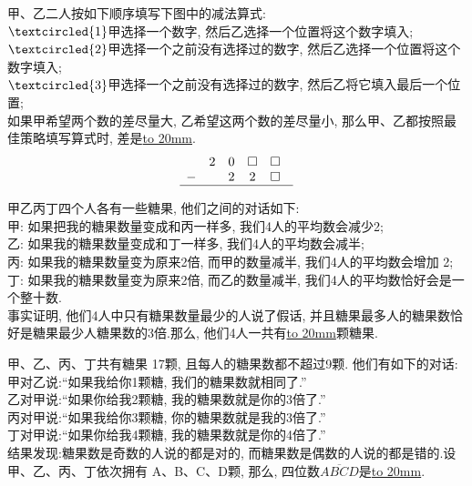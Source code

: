 \item {
    甲、乙二人按如下顺序填写下图中的减法算式:\\
    $\textcircled{1}$甲选择一个数字, 然后乙选择一个位置将这个数字填入;\\
    $\textcircled{2}$甲选择一个之前没有选择过的数字, 然后乙选择一个位置将这个数字填入;\\
    $\textcircled{3}$甲选择一个之前没有选择过的数字, 然后乙将它填入最后一个位置;\\
    如果甲希望两个数的差尽量大, 乙希望这两个数的差尽量小, 那么甲、乙都按照最佳策略填写算式时, 差是\underline{\hbox to 20mm{}}.
    \[
    \begin{array}{l@{\hspace{1em}} c@{\hspace{1em}} c@{\hspace{1em}} c@{\hspace{1em}} c@{\hspace{1em}}}
    & 2 & 0 & \square & \square \\
    - & & 2 & 2 & \square \\ 
    \hline
    \end{array}
    \]
    \vspace{1cm}
}

\item {
    甲乙丙丁四个人各有一些糖果, 他们之间的对话如下:\\
    甲: 如果把我的糖果数量变成和丙一样多, 我们4人的平均数会减少2;\\
    乙: 如果我的糖果数量变成和丁一样多, 我们4人的平均数会减半; \\
    丙: 如果我的糖果数量变为原来2倍, 而甲的数量减半, 我们4人的平均数会增加 2; \\
    丁: 如果我的糖果数量变为原来2倍, 而乙的数量减半, 我们4人的平均数恰好会是一个整十数. \\
    事实证明, 他们4人中只有糖果数量最少的人说了假话, 并且糖果最多人的糖果数恰好是糖果最少人糖果数的3倍.那么, 他们4人一共有\underline{\hbox to 20mm{}}颗糖果.
    \vspace{1cm}
}

\item {
    甲、乙、丙、丁共有糖果 17颗, 且每人的糖果数都不超过9颗. 他们有如下的对话:\\
    甲对乙说:``如果我给你1颗糖, 我们的糖果数就相同了.''\\
    乙对甲说:``如果你给我2颗糖, 我的糖果数就是你的3倍了.''\\
    丙对甲说:``如果我给你3颗糖, 你的糖果数就是我的3倍了.''\\
    丁对甲说:``如果你给我4颗糖, 我的糖果数就是你的4倍了.''\\
    结果发现:糖果数是奇数的人说的都是对的, 而糖果数是偶数的人说的都是错的.设甲、乙、丙、丁依次拥有 A、B、C、D颗, 那么, 四位数$\overline{ABCD}$是\underline{\hbox to 20mm{}}.
    \vspace{1cm}
}

